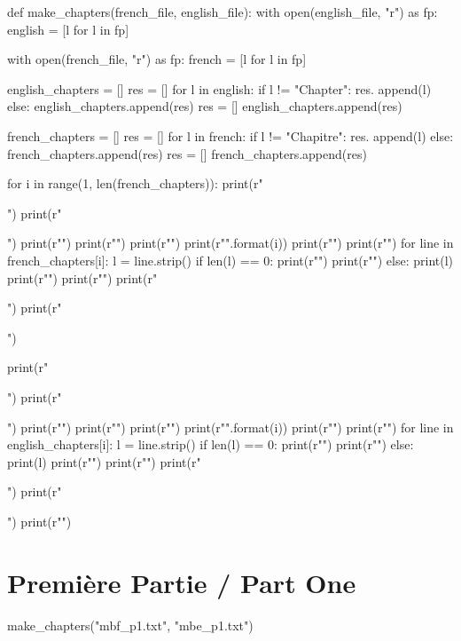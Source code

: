 \documentclass[a5paper]{book}
\begin{document}
\begin{pycode}
def make_chapters(french_file, english_file):
    with open(english_file, "r") as fp:
        english = [l for l in fp]

    with open(french_file, "r") as fp:
        french = [l for l in fp]

    english_chapters = []
    res = []
    for l in english:
        if l != "Chapter\n":
            res. append(l)
        else:
            english_chapters.append(res)
            res = []
    english_chapters.append(res)

    french_chapters = []
    res = []
    for l in french:
        if l != "Chapitre\n":
            res. append(l)
        else:
            french_chapters.append(res)
            res = []
    french_chapters.append(res)

    for i in range(1, len(french_chapters)):
        print(r"\begin{pages}")
        print(r"\begin{Leftside}")
        print(r"")
        print(r"\beginnumbering")
        print(r"\pstart")
        print(r"".format(i))
        print(r"\pend")
        print(r"\pstart")
        for line in french_chapters[i]:
            l = line.strip()
            if len(l) == 0: 
                print(r"\pend")
                print(r"\pstart")
            else:
                print(l)
        print(r"\pend")
        print(r"\endnumbering")
        print(r"\end{Leftside}")
        print(r"\end{pages}")

        print(r"\begin{pages}")
        print(r"\begin{Rightside}")
        print(r"")
        print(r"\beginnumbering")
        print(r"\pstart")
        print(r"".format(i))
        print(r"\pend")
        print(r"\pstart")
        for line in english_chapters[i]:
            l = line.strip()
            if len(l) == 0: 
                print(r"\pend")
                print(r"\pstart")
            else:
                print(l)
        print(r"\pend")
        print(r"\endnumbering")
        print(r"\end{Rightside}")
        print(r"\end{pages}")
        print(r"\Pages")
\end{pycode}

\part{Première Partie / Part One}
\begin{pycode}
make_chapters("mbf_p1.txt", "mbe_p1.txt")
\end{pycode}
\end{document}
